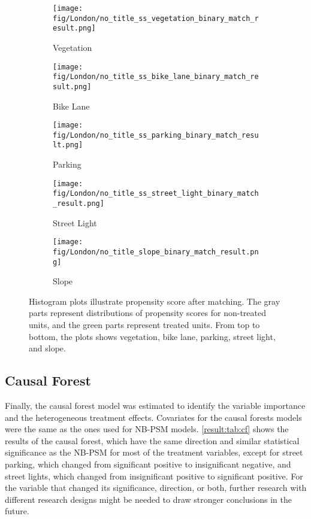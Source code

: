 \documentclass[preprint,12pt, authoryear]{elsarticle}
\begin{document}
\begin{figure}
    \centering

    \begin{subfigure}{.6\textwidth}
        \centering
        \texttt{[image: fig/London/no\_title\_ss\_vegetation\_binary\_match\_result.png]}
        \caption*{Vegetation}
    \end{subfigure}%

    \begin{subfigure}{.6\textwidth}
        \centering
        \texttt{[image: fig/London/no\_title\_ss\_bike\_lane\_binary\_match\_result.png]}
        \caption*{Bike Lane}
    \end{subfigure}%

    \begin{subfigure}{.6\textwidth}
        \centering
        \texttt{[image: fig/London/no\_title\_ss\_parking\_binary\_match\_result.png]}
        \caption*{Parking}
    \end{subfigure}%

    \begin{subfigure}{.6\textwidth}
        \centering
        \texttt{[image: fig/London/no\_title\_ss\_street\_light\_binary\_match\_result.png]}
        \caption*{Street Light}
    \end{subfigure}%

    \begin{subfigure}{.6\textwidth}
        \centering
        \texttt{[image: fig/London/no\_title\_slope\_binary\_match\_result.png]}
        \caption*{Slope}
    \end{subfigure}%

    \caption{Histogram plots illustrate propensity score after matching. The gray parts represent distributions of propensity scores for non-treated units, and the green parts represent treated units. From top to bottom, the plots shows vegetation, bike lane, parking, street light, and slope.}
    \label{result:fig:psm}
\end{figure}

\subsection{Causal Forest}
Finally, the causal forest model was estimated to identify the variable importance and the heterogeneous treatment effects. Covariates for the causal forests models were the same as the ones used for NB-PSM models. \autoref{result:tab:cf} shows the results of the causal forest, which have the same direction and similar statistical significance as the NB-PSM for most of the treatment variables, except for street parking, which changed from significant positive to insignificant negative, and street lights, which changed from insignificant positive to significant positive.
For the variable that changed its significance, direction, or both, further research with different research designs might be needed to draw stronger conclusions in the future.
\end{document}
